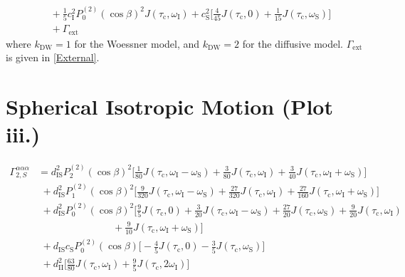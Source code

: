 \begin{appendixtext}
\begin{equation*}
\begin{split}
&\hspace{4pt}+\frac{1}{5} c_{\text{I}}^2P_0^{(2)}(\cos\beta)^2J\left(\tau_{\text{c}},\omega_{\text{I}}\right)+c_{\text{S}}^2\bigg[\frac{4}{45}J\left(\tau_{\text{c}},0\right)+\frac{1}{15}J(\tau_{\text{c}},\omega_{\text{S}})\bigg] \\
&\hspace{4pt} +\Gamma_{\text{ext}}
\end{split}
\end{equation*}
where $k_{\text{DW}} = 1$ for the Woessner model, and $k_{\text{DW}} = 2$ for the diffusive model. $\Gamma_{\text{ext}}$ is given in \ref{External}. \\
\section{Spherical Isotropic Motion (Plot iii.)}
\begin{equation*}
\begin{split}
\Gamma_{2,S}^{\alpha\alpha\alpha}&=d_{\text{IS}}^2P_2^{(2)}(\cos\beta)^2\bigg[\frac{1}{80}J\left(\tau_{\text{c}},\omega_{\text{I}}-\omega_{\text{S}}\right)+\frac{3}{80}J\left(\tau_{\text{c}},\omega_{\text{I}}\right) +\frac{3}{40}J\left(\tau_{\text{c}},\omega_{\text{I}}+\omega_{\text{S}}\right)\bigg] \\
&\hspace{4pt}+d_{\text{IS}}^2P_1^{(2)}(\cos\beta)^2\bigg[\frac{9}{320}J\left(\tau_{\text{c}},\omega_{\text{I}}-\omega_{\text{S}}\right)+\frac{27}{320}J\left(\tau_{\text{c}},\omega_{\text{I}}\right)+\frac{27}{160}J\left(\tau_{\text{c}},\omega_{\text{I}}+\omega_{\text{S}}\right)\bigg] \\
&\hspace{4pt}+d_{\text{IS}}^2P_0^{(2)}(\cos\beta)^2\bigg[\frac{9}{5}J(\tau_{\text{c}},0)+\frac{3}{20}J\left(\tau_{\text{c}},\omega_{\text{I}}-\omega_{\text{S}}\right)+\frac{27}{20}J\left(\tau_{\text{c}},\omega_{\text{S}}\right)+\frac{9}{20}J\left(\tau_{\text{c}},\omega_{\text{I}}\right) \\ 
&\hspace{90pt}+\frac{9}{10}J\left(\tau_{\text{c}},\omega_{\text{I}}+\omega_{\text{S}}\right)\bigg] \\
&\hspace{4pt}+d_{\text{IS}}c_{\text{S}}P_0^{(2)}(\cos\beta)\bigg[-\frac{4}{5}J\left(\tau_{\text{c}},0\right)-\frac{3}{5}J\left(\tau_{\text{c}},\omega_{\text{S}}\right)\bigg] \\
&\hspace{4pt}+d_{\text{II}}^2\bigg[\frac{63}{80}J\left(\tau_{\text{c}},\omega_{\text{I}}\right)+ \frac{9}{5}J\left(\tau_{\text{c}},2\omega_{\text{I}}\right)\bigg] \\

\end{split}
\end{equation*}
\end{appendixtext}
